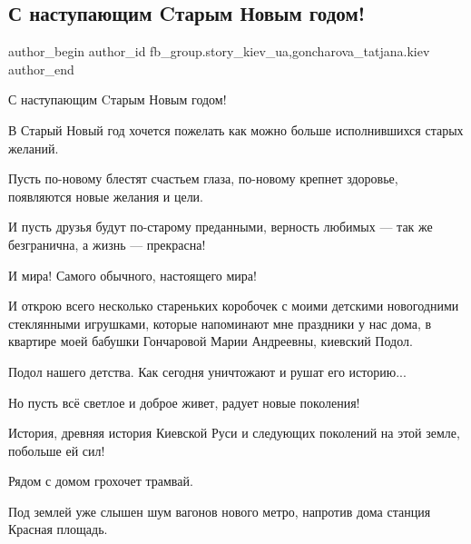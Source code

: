  
 
 
 
 
 
\subsection{С наступающим Cтарым Новым годом!}
\label{sec:14_01_2022.fb.fb_group.story_kiev_ua.1.staryj_novyj_god}
 
\ifcmt
 author_begin
   author_id fb_group.story_kiev_ua,goncharova_tatjana.kiev
 author_end
\fi

С наступающим Cтарым Новым годом!

В Старый Новый год хочется пожелать как можно больше исполнившихся старых
желаний. 


Пусть по-новому блестят счастьем глаза, по-новому крепнет здоровье, появляются
новые желания и цели. 

И пусть друзья будут по-старому преданными, верность любимых — так же
безгранична, а жизнь — прекрасна! 

И мира! Самого обычного, настоящего мира!

И открою всего несколько стареньких коробочек с моими детскими новогодними
стеклянными игрушками, которые напоминают мне праздники у нас дома, в квартире
моей бабушки Гончаровой Марии Андреевны, киевский Подол.

Подол нашего детства. Как сегодня уничтожают и рушат его историю...

Но пусть всё светлое и доброе живет, радует новые поколения!

История, древняя история Киевской Руси и следующих поколений на этой земле,
побольше ей сил!


Рядом с домом грохочет трамвай.

Под землей уже слышен шум вагонов нового метро, напротив дома станция Красная
площадь.

